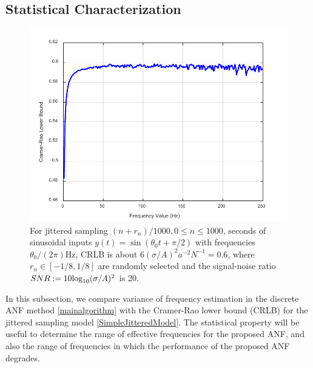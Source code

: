 \documentclass{UCF_ETD}
\begin{document}
\subsection{Statistical Characterization}
\label{statisticalChar.subsection}


\begin{figure}[H]
\begin{center}
\includegraphics[scale=0.8]{NonuniformANF/CLRB_noise}
\caption{For jittered sampling
$(n+r_n)/1000, 0\le n\le 1000$, seconds
 of  sinusoidal inputs  $y(t)=\sin (\theta_0 t+\pi/2)$  with  frequencies $\theta_0/(2\pi)$Hz,
  CRLB is about $6(\sigma/A)^2 a^{-2}N^{-1}=0.6$,
  where $r_n\in [-1/8, 1/8]$ are randomly selected
  and
  the signal-noise ratio $SNR:=10{\rm log}_{10} (\sigma/A)^2$ is 20.} %
\label{cramerraobound.fig}
\end{center}
\end{figure}





In this subsection, we compare variance of frequency estimation  in  the discrete ANF method \eqref{mainalgorithm}
with the Cramer-Rao lower bound (CRLB) for the jittered sampling model
\eqref{SimpleJitteredModel}.  The  statistical property will be useful to
 determine the range of effective frequencies for  the proposed ANF,
 and also the range of %
 frequencies in which the performance of  the proposed ANF degrades.
\end{document}
